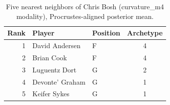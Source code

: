 \begin{table}[htbp]
  \centering\small
  \begin{tabular}{rllc}
    \toprule
    Rank & Player & Position & Archetype \\
    \midrule
    1 & David Andersen & F & 4 \\
    2 & Brian Cook & F & 4 \\
    3 & Luguentz Dort & G & 2 \\
    4 & Devonte' Graham & G & 1 \\
    5 & Keifer Sykes & G & 1 \\
    \bottomrule
  \end{tabular}
  \caption{Five nearest neighbors of Chris Bosh (curvature_m4 modality), Procrustes-aligned posterior mean.}
  \label{tab:Chris_Bosh_neighbors_curvature_m4}
\end{table}

